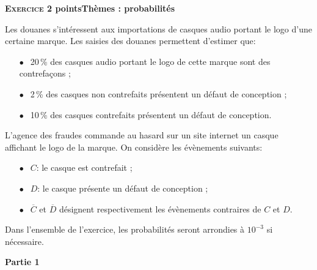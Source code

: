 \documentclass[11pt]{article}
\begin{document}
\bigskip

\textbf{\textsc{Exercice 2}  points\hfill Thèmes : probabilités}

\medskip

Les douanes s'intéressent aux importations de casques audio portant le logo d'une certaine marque. Les saisies des douanes permettent d'estimer que:

\setlength\parindent{10mm}
\begin{itemize}
\item[$\bullet~~$] 20\,\% des casques audio portant le logo de cette marque sont des contrefaçons ;
\item[$\bullet~~$] 2\,\% des casques non contrefaits présentent un défaut de conception ; \item[$\bullet~~$] 10\,\% des casques contrefaits présentent un défaut de conception.
\end{itemize}
\setlength\parindent{0mm}

L'agence des fraudes commande au hasard sur un site internet un casque affichant le logo de la marque. On considère les évènements suivants:

\setlength\parindent{10mm}
\begin{itemize}
\item[$\bullet~~$] $C$: \og le casque est contrefait \fg{} ;
\item[$\bullet~~$] $D$: \og le casque présente un défaut de conception \fg{} ;
\item[$\bullet~~$] $\overline{C}$ et $\overline{D}$ désignent respectivement les évènements contraires de $C$ et $D$.
\end{itemize}
\setlength\parindent{0mm}

Dans l'ensemble de l'exercice, les probabilités seront arrondies à $10^{-3}$ si nécessaire.

\bigskip

\textbf{Partie 1}

\medskip
\end{document}
